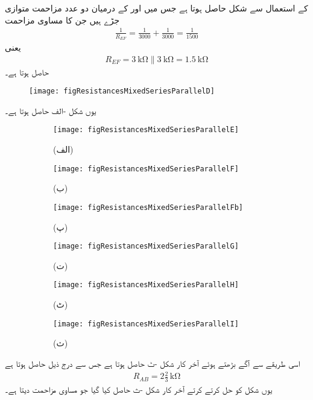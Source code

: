  کے استعمال سے شکل   حاصل ہوتا ہے جس میں  اور  کے درمیان دو عدد  مزاحمت متوازی جڑے ہیں جن کا مساوی مزاحمت
\begin{align*}
\frac{1}{R_{EF}}=\frac{1}{3000}+\frac{1}{3000}=\frac{1}{1500}
\end{align*}
یعنی
\begin{align*}
R_{EF}=\SI{3}{\kilo\ohm} \parallel \SI{3}{\kilo\ohm}=\SI{1.5}{\kilo\ohm}
\end{align*}
حاصل ہوتا ہے۔
\begin{figure}
\centering
\texttt{[image: figResistancesMixedSeriesParallelD]}
\caption{}
\label{مشق_مزاحمتی_سلسلہ_وار_متوازی_مزاحمت_پ}
\end{figure}
یوں شکل -الف حاصل ہوتا ہے۔
\begin{figure}
\centering
\begin{subfigure}{0.5\textwidth}
\centering
\texttt{[image: figResistancesMixedSeriesParallelE]}
\caption*{(الف)}
\end{subfigure}%
\begin{subfigure}{0.5\textwidth}
\centering
\texttt{[image: figResistancesMixedSeriesParallelF]}
\caption*{(ب)}
\end{subfigure}
%
\begin{subfigure}{0.5\textwidth}
\centering
\texttt{[image: figResistancesMixedSeriesParallelFb]}
\caption*{(پ)}
\end{subfigure}%
\begin{subfigure}{0.5\textwidth}
\centering
\texttt{[image: figResistancesMixedSeriesParallelG]}
\caption*{(ت)}
\end{subfigure}
%
\begin{subfigure}{0.5\textwidth}
\centering
\texttt{[image: figResistancesMixedSeriesParallelH]}
\caption*{(ٹ)}
\end{subfigure}%
\begin{subfigure}{0.5\textwidth}
\centering
\texttt{[image: figResistancesMixedSeriesParallelI]}
\caption*{(ث)}
\end{subfigure}%
\caption{}
\label{مشق_مزاحمتی_سلسلہ_وار_متوازی_مزاحمت_ت}
\end{figure}
اسی طریقے سے آگے بڑھتے ہوئے آخر کار شکل -ٹ حاصل ہوتا ہے جس سے  درج ذیل حاصل ہوتا ہے
\begin{align*}
R_{AB}=2\frac{2}{3}\, \si{\kilo\ohm}
\end{align*}
یوں شکل   کو حل کرتے کرتے آخر کار  شکل -ث حاصل کیا گیا جو مساوی مزاحمت  دیتا  ہے۔

